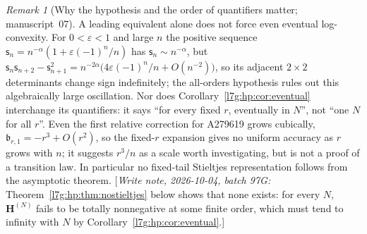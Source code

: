 \documentclass[11pt,letterpaper]{article}
\theoremstyle{remark}\newtheorem{remark}[theorem]{Remark}
\newcommand{\hpnote}[1]{\textup{[}\emph{Write note, 2026-10-04, batch 97G:} #1\textup{]}}
\newcounter{l7gtrsavedeq}
\begin{document}
\begin{remark}[Why the hypothesis and the order of quantifiers matter; manuscript~07]\label{l7g:hp:rem:quantifiers}
A leading equivalent alone does not force even eventual log-convexity. For
$0<\varepsilon<1$ and large $n$ the positive sequence
$\mathsf s_n=n^{-\alpha}(1+\varepsilon(-1)^n/n)$ has $\mathsf s_n\sim
n^{-\alpha}$, but
$\mathsf s_n\mathsf s_{n+2}-\mathsf s_{n+1}^2
=n^{-2\alpha}\bigl(4\varepsilon(-1)^n/n+O(n^{-2})\bigr)$, so its adjacent
$2\times2$ determinants change sign indefinitely; the all-orders hypothesis
rules out this algebraically large oscillation. Nor does
Corollary~\ref{l7g:hp:cor:eventual} interchange its quantifiers: it says
``for every fixed $r$, eventually in $N$'', not ``one $N$ for all $r$''.
Even the first relative correction for A279619 grows cubically,
$\mathfrak b_{r,1}=-r^3+O(r^2)$, so the fixed-$r$ expansion gives no uniform
accuracy as $r$ grows with $n$; it suggests $r^3/n$ as a scale worth
investigating, but is not a proof of a transition law. In particular no
fixed-tail Stieltjes representation follows from the asymptotic theorem.
\hpnote{Theorem~\ref{l7g:hp:thm:nostieltjes} below shows that none
exists: for every $N$, $\mathbf H^{(N)}$ fails to be totally nonnegative at
some finite order, which must tend to infinity with $N$ by
Corollary~\ref{l7g:hp:cor:eventual}.}
\end{remark}
\end{document}
